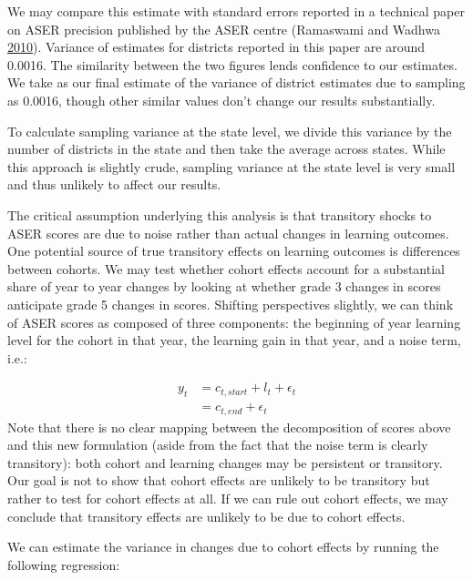 \documentclass[
  11pt,
]{article}
\begin{document}
We may compare this estimate with standard errors reported in a technical paper on ASER precision published by the ASER centre (Ramaswami and Wadhwa \protect\hyperlink{ref-ramaswami2010survey}{2010}). Variance of estimates for districts reported in this paper are around 0.0016. The similarity between the two figures lends confidence to our estimates. We take as our final estimate of the variance of district estimates due to sampling as 0.0016, though other similar values don't change our results substantially.

To calculate sampling variance at the state level, we divide this variance by the number of districts in the state and then take the average across states. While this approach is slightly crude, sampling variance at the state level is very small and thus unlikely to affect our results.

The critical assumption underlying this analysis is that transitory shocks to ASER scores are due to noise rather than actual changes in learning outcomes. One potential source of true transitory effects on learning outcomes is differences between cohorts. We may test whether cohort effects account for a substantial share of year to year changes by looking at whether grade 3 changes in scores anticipate grade 5 changes in scores. Shifting perspectives slightly, we can think of ASER scores as composed of three components: the beginning of year learning level for the cohort in that year, the learning gain in that year, and a noise term, i.e.:

\[
\begin{aligned}
 y_{t} &= c_{t, start} + l_{t} + \epsilon_{t} \\
 & = c_{t,end} + \epsilon_t
\end{aligned}
\]
Note that there is no clear mapping between the decomposition of scores above and this new formulation (aside from the fact that the noise term is clearly transitory): both cohort and learning changes may be persistent or transitory. Our goal is not to show that cohort effects are unlikely to be transitory but rather to test for cohort effects at all. If we can rule out cohort effects, we may conclude that transitory effects are unlikely to be due to cohort effects.

We can estimate the variance in changes due to cohort effects by running the following regression:
\end{document}
